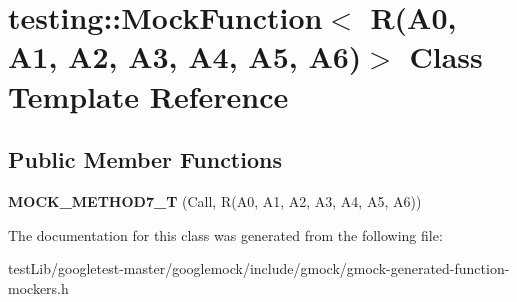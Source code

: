 \hypertarget{classtesting_1_1MockFunction_3_01R_07A0_00_01A1_00_01A2_00_01A3_00_01A4_00_01A5_00_01A6_08_4}{}\section{testing\+:\+:Mock\+Function$<$ R(A0, A1, A2, A3, A4, A5, A6)$>$ Class Template Reference}
\label{classtesting_1_1MockFunction_3_01R_07A0_00_01A1_00_01A2_00_01A3_00_01A4_00_01A5_00_01A6_08_4}
\subsection*{Public Member Functions}
\begin{DoxyCompactItemize}
\item 
\mbox{\label{classtesting_1_1MockFunction_3_01R_07A0_00_01A1_00_01A2_00_01A3_00_01A4_00_01A5_00_01A6_08_4_a965d96b3e212c5bd0391302fcee943d6}} 
{\bfseries M\+O\+C\+K\+\_\+\+M\+E\+T\+H\+O\+D7\+\_\+T} (Call, R(A0, A1, A2, A3, A4, A5, A6))
\end{DoxyCompactItemize}


The documentation for this class was generated from the following file\+:\begin{DoxyCompactItemize}
\item 
test\+Lib/googletest-\/master/googlemock/include/gmock/gmock-\/generated-\/function-\/mockers.\+h\end{DoxyCompactItemize}
